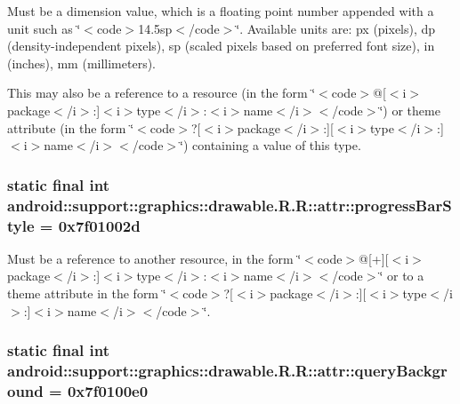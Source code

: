 Must be a dimension value, which is a floating point number appended with a unit such as \char`\"{}$<$code$>$14.5sp$<$/code$>$\char`\"{}. Available units are: px (pixels), dp (density-independent pixels), sp (scaled pixels based on preferred font size), in (inches), mm (millimeters). 

This may also be a reference to a resource (in the form \char`\"{}$<$code$>$@\mbox{[}$<$i$>$package$<$/i$>$:\mbox{]}$<$i$>$type$<$/i$>$:$<$i$>$name$<$/i$>$$<$/code$>$\char`\"{}) or theme attribute (in the form \char`\"{}$<$code$>$?\mbox{[}$<$i$>$package$<$/i$>$:\mbox{]}\mbox{[}$<$i$>$type$<$/i$>$:\mbox{]}$<$i$>$name$<$/i$>$$<$/code$>$\char`\"{}) containing a value of this type. \hypertarget{classandroid_1_1support_1_1graphics_1_1drawable_1_1_r_1_1attr_d08f47ab98778ebae686213dc4ed3726}{
\subsubsection[{progressBarStyle}]{\setlength{\rightskip}{0pt plus 5cm}static final int android::support::graphics::drawable.R.R::attr::progressBarStyle = 0x7f01002d}}
\label{classandroid_1_1support_1_1graphics_1_1drawable_1_1_r_1_1attr_d08f47ab98778ebae686213dc4ed3726}


Must be a reference to another resource, in the form \char`\"{}$<$code$>$@\mbox{[}+\mbox{]}\mbox{[}$<$i$>$package$<$/i$>$:\mbox{]}$<$i$>$type$<$/i$>$:$<$i$>$name$<$/i$>$$<$/code$>$\char`\"{} or to a theme attribute in the form \char`\"{}$<$code$>$?\mbox{[}$<$i$>$package$<$/i$>$:\mbox{]}\mbox{[}$<$i$>$type$<$/i$>$:\mbox{]}$<$i$>$name$<$/i$>$$<$/code$>$\char`\"{}. \hypertarget{classandroid_1_1support_1_1graphics_1_1drawable_1_1_r_1_1attr_ebee1e9977a985e49015b6b3c6563cd3}{
\subsubsection[{queryBackground}]{\setlength{\rightskip}{0pt plus 5cm}static final int android::support::graphics::drawable.R.R::attr::queryBackground = 0x7f0100e0}}
\label{classandroid_1_1support_1_1graphics_1_1drawable_1_1_r_1_1attr_ebee1e9977a985e49015b6b3c6563cd3}


